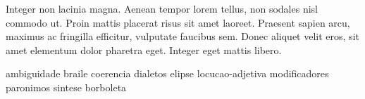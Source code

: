 \lipsum[20]

\lipsum[21]

Integer non lacinia magna. Aenean tempor lorem tellus, non sodales nisl commodo ut. Proin mattis placerat risus sit amet laoreet. Praesent sapien arcu, maximus ac fringilla efficitur, vulputate faucibus sem. Donec aliquet velit eros, sit amet elementum dolor pharetra eget. Integer eget mattis libero.

\Gls{ambiguidade}
\Gls{braile}
\Gls{coerencia}
\Gls{dialetos}
\Gls{elipse}
\Gls{locucao-adjetiva}
\Gls{modificadores}
\Gls{paronimos}
\Gls{sintese}
\Gls{borboleta}